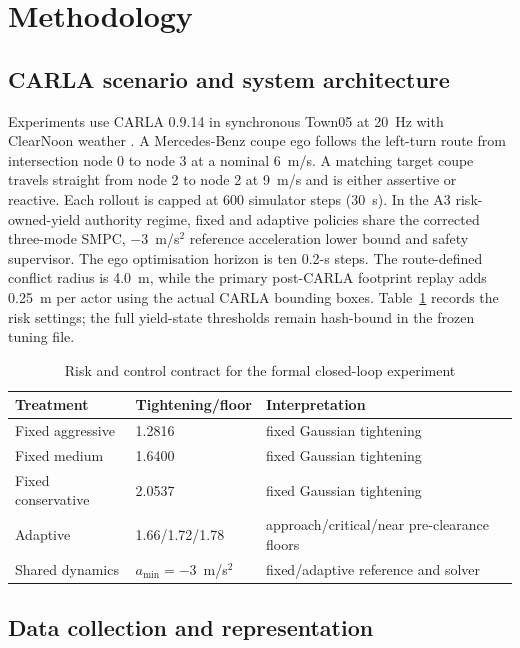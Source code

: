 \section{Methodology}
\label{sec:methods}

\subsection{CARLA scenario and system architecture}

Experiments use CARLA 0.9.14 in synchronous Town05 at 20~Hz with ClearNoon
weather \citep{dosovitskiy2017carla}. A Mercedes-Benz coupe ego follows the
left-turn route from intersection node 0 to node 3 at a nominal 6~m/s. A
matching target coupe travels straight from node 2 to node 2 at 9~m/s and is
either assertive or reactive. Each rollout is capped at 600 simulator steps
(30~s). In the A3 risk-owned-yield authority regime, fixed and adaptive
policies share the corrected three-mode SMPC, $-3$~m/s$^2$ reference
acceleration lower bound and safety supervisor. The ego optimisation horizon
is ten 0.2-s steps. The route-defined conflict radius is 4.0~m, while the
primary post-CARLA footprint replay adds 0.25~m per actor using the actual
CARLA bounding boxes. Table~\ref{tab:risk-contract} records the risk settings;
the full yield-state thresholds remain hash-bound in the frozen tuning file.

\begin{table}[t]
  \caption{Risk and control contract for the formal closed-loop experiment}
  \label{tab:risk-contract}
  \centering
  \small
  \begin{tabular}{@{}lll@{}}
    \toprule
    Treatment & Tightening/floor & Interpretation \\
    \midrule
    Fixed aggressive & 1.2816 & fixed Gaussian tightening \\
    Fixed medium & 1.6400 & fixed Gaussian tightening \\
    Fixed conservative & 2.0537 & fixed Gaussian tightening \\
    Adaptive & 1.66/1.72/1.78 & approach/critical/near pre-clearance floors \\
    Shared dynamics & $a_{\min}=-3$~m/s$^2$ & fixed/adaptive reference and solver \\
    \bottomrule
  \end{tabular}
\end{table}

\subsection{Data collection and representation}

